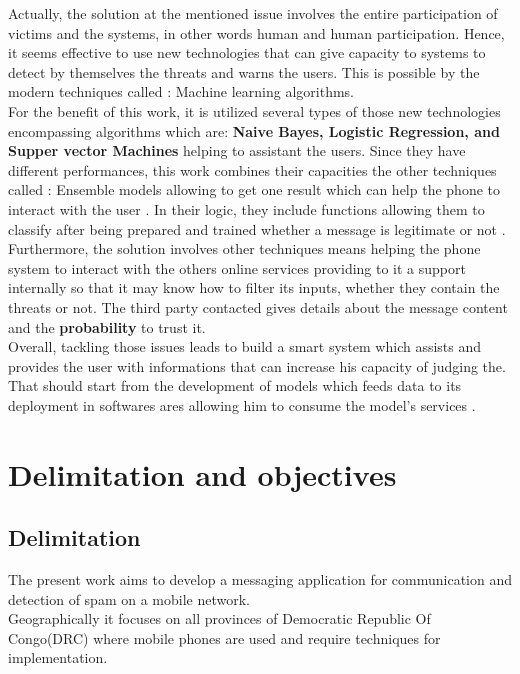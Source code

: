 \documentclass[12pt,a4paper, oneside]{book}
\begin{document}
	 Actually, the solution at the mentioned issue involves the entire participation of victims and the systems, in other words human and human participation. Hence, it seems effective to use new technologies that can give capacity to systems to detect by themselves the threats and warns the users. This is possible by the modern techniques called : Machine learning algorithms.\\
 
	 For the benefit of this work, it is utilized several types of those new technologies encompassing algorithms which are: \textbf{Naive Bayes, Logistic Regression, and Supper vector Machines} helping to assistant the users. Since they have different performances, this work combines their capacities the other techniques called : Ensemble models allowing to get one result which can help the phone to interact with the user \cite{raschka2017python}. In their logic, they include functions allowing them to classify after being prepared and trained whether a message is legitimate or not \cite{karl1986model}. \\
	 	 
	 Furthermore, the solution involves other techniques means helping the phone system to interact with the others online services providing to it a support internally so that it may know how to filter its inputs, whether they contain the threats or not. The third party contacted gives details about the message content and the \textbf{probability} to trust it.\\
	 	 
	 Overall, tackling those issues leads to build a smart system which assists and provides the user with informations that can increase his capacity of judging the. That should start from the development of models which feeds data to its deployment in softwares ares allowing him to consume the model's services \cite{hadullo2021machine}.
	 	 
	\section{Delimitation and objectives}  
	\subsection{Delimitation}
	The present work aims to develop a messaging application for communication and detection of spam on a mobile network.
	\\
	
	Geographically it focuses on all provinces of Democratic Republic Of Congo(DRC) where mobile phones are used and require techniques for implementation. \\
		
\end{document}
